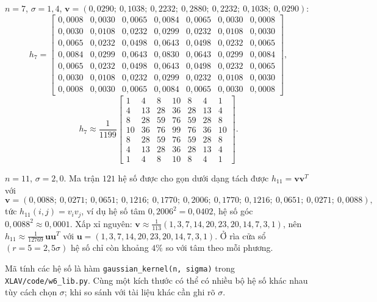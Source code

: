 $n = 7$, $\sigma = 1{,}4$, $\mathbf{v} = (0{,}0290;\ 0{,}1038;\ 0{,}2232;\ 0{,}2880;\ 0{,}2232;\ 0{,}1038;\ 0{,}0290)$:
\[
h_7 = \begin{bmatrix}
0{,}0008 & 0{,}0030 & 0{,}0065 & 0{,}0084 & 0{,}0065 & 0{,}0030 & 0{,}0008 \\
0{,}0030 & 0{,}0108 & 0{,}0232 & 0{,}0299 & 0{,}0232 & 0{,}0108 & 0{,}0030 \\
0{,}0065 & 0{,}0232 & 0{,}0498 & 0{,}0643 & 0{,}0498 & 0{,}0232 & 0{,}0065 \\
0{,}0084 & 0{,}0299 & 0{,}0643 & 0{,}0830 & 0{,}0643 & 0{,}0299 & 0{,}0084 \\
0{,}0065 & 0{,}0232 & 0{,}0498 & 0{,}0643 & 0{,}0498 & 0{,}0232 & 0{,}0065 \\
0{,}0030 & 0{,}0108 & 0{,}0232 & 0{,}0299 & 0{,}0232 & 0{,}0108 & 0{,}0030 \\
0{,}0008 & 0{,}0030 & 0{,}0065 & 0{,}0084 & 0{,}0065 & 0{,}0030 & 0{,}0008
\end{bmatrix},
\]
\[
h_7 \approx \frac{1}{1199}\begin{bmatrix}
1 & 4 & 8 & 10 & 8 & 4 & 1 \\
4 & 13 & 28 & 36 & 28 & 13 & 4 \\
8 & 28 & 59 & 76 & 59 & 28 & 8 \\
10 & 36 & 76 & 99 & 76 & 36 & 10 \\
8 & 28 & 59 & 76 & 59 & 28 & 8 \\
4 & 13 & 28 & 36 & 28 & 13 & 4 \\
1 & 4 & 8 & 10 & 8 & 4 & 1
\end{bmatrix}.
\]

$n = 11$, $\sigma = 2{,}0$. Ma trận $121$ hệ số được cho gọn dưới dạng tách được $h_{11} = \mathbf{v}\mathbf{v}^T$ với
\[
\mathbf{v} = (0{,}0088;\ 0{,}0271;\ 0{,}0651;\ 0{,}1216;\ 0{,}1770;\ 0{,}2006;\ 0{,}1770;\ 0{,}1216;\ 0{,}0651;\ 0{,}0271;\ 0{,}0088),
\]
tức $h_{11}(i, j) = v_i v_j$, ví dụ hệ số tâm $0{,}2006^2 = 0{,}0402$, hệ số góc $0{,}0088^2 \approx 0{,}0001$. Xấp xỉ nguyên: $\mathbf{v} \approx \frac{1}{113}(1, 3, 7, 14, 20, 23, 20, 14, 7, 3, 1)$, nên $h_{11} \approx \frac{1}{12769}\,\mathbf{u}\mathbf{u}^T$ với $\mathbf{u} = (1, 3, 7, 14, 20, 23, 20, 14, 7, 3, 1)$. Ở rìa cửa sổ $(r = 5 = 2{,}5\sigma)$ hệ số chỉ còn khoảng $4\%$ so với tâm theo mỗi phương.

Mã tính các hệ số là hàm \texttt{gaussian\_kernel(n, sigma)} trong \texttt{XLAV/code/w6\_lib.py}. Cùng một kích thước có thể có nhiều bộ hệ số khác nhau tùy cách chọn $\sigma$; khi so sánh với tài liệu khác cần ghi rõ $\sigma$.

